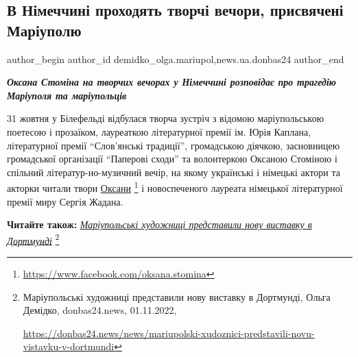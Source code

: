  
 
 
 
 
 
\subsection{В Німеччині проходять творчі вечори, присвячені Маріуполю}
\label{sec:02_11_2022.stz.news.ua.donbas24.1.nimecchyna_tvorchi_vechory_oksana_stomina}
 
\ifcmt
 author_begin
   author_id demidko_olga.mariupol,news.ua.donbas24
 author_end
\fi


\begin{center}
  \em\bfseries\color{blue}\Large
Оксана Стоміна на творчих вечорах у Німеччині розповідає про трагедію Маріуполя
та маріупольців 
\end{center}

31 жовтня у Білефельді відбулася творча зустріч з відомою маріупольською
поетесою і прозаїком, лауреаткою літературної премії ім. Юрія Каплана,
літературної премії \enquote{Слов'янські традиції}, громадською діячкою, засновницею
громадської організації \enquote{Паперові сходи} та волонтеркою Оксаною Стоміною і
спільний літератур\hyp{}но-музичний вечір, на якому українські і німецькі актори та
акторки читали твори \href{https://www.facebook.com/oksana.stomina}{Оксани}%
\footnote{\url{https://www.facebook.com/oksana.stomina}}
і новоспеченого лауреата німецької літературної премії миру Сергія Жадана.

\textbf{Читайте також:} \href{https://donbas24.news/news/mariupolski-xudoznici-predstavili-novu-vistavku-v-dortmundi}{\emph{Маріупольські художниці представили нову виставку в Дортмунді}}%
\footnote{Маріупольські художниці представили нову виставку в Дортмунді, Ольга Демідко, donbas24.news, 01.11.2022, \par%
\url{https://donbas24.news/news/mariupolski-xudoznici-predstavili-novu-vistavku-v-dortmundi}%
}

